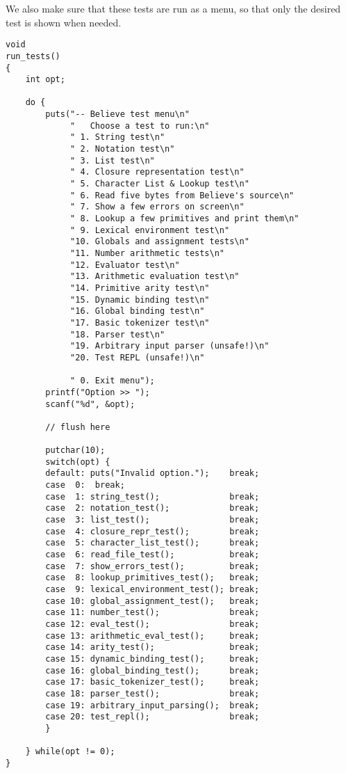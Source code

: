 \documentclass[openright,a4paper,twoside,12pt]{memoir}
\begin{document}
We also make sure that these tests are run as a menu, so that only the
desired test is shown when needed.

\begin{verbatim}
void
run_tests()
{
    int opt;

    do {
        puts("-- Believe test menu\n"
             "   Choose a test to run:\n"
             " 1. String test\n"
             " 2. Notation test\n"
             " 3. List test\n"
             " 4. Closure representation test\n"
             " 5. Character List & Lookup test\n"
             " 6. Read five bytes from Believe's source\n"
             " 7. Show a few errors on screen\n"
             " 8. Lookup a few primitives and print them\n"
             " 9. Lexical environment test\n"
             "10. Globals and assignment tests\n"
             "11. Number arithmetic tests\n"
             "12. Evaluator test\n"
             "13. Arithmetic evaluation test\n"
             "14. Primitive arity test\n"
             "15. Dynamic binding test\n"
             "16. Global binding test\n"
             "17. Basic tokenizer test\n"
             "18. Parser test\n"
             "19. Arbitrary input parser (unsafe!)\n"
             "20. Test REPL (unsafe!)\n"
             
             " 0. Exit menu");
        printf("Option >> ");
        scanf("%d", &opt);

        // flush here

        putchar(10);
        switch(opt) {
        default: puts("Invalid option.");    break;
        case  0:  break;
        case  1: string_test();              break;
        case  2: notation_test();            break;
        case  3: list_test();                break;
        case  4: closure_repr_test();        break;
        case  5: character_list_test();      break;
        case  6: read_file_test();           break;
        case  7: show_errors_test();         break;
        case  8: lookup_primitives_test();   break;
        case  9: lexical_environment_test(); break;
        case 10: global_assignment_test();   break;
        case 11: number_test();              break;
        case 12: eval_test();                break;
        case 13: arithmetic_eval_test();     break;
        case 14: arity_test();               break;
        case 15: dynamic_binding_test();     break;
        case 16: global_binding_test();      break;
        case 17: basic_tokenizer_test();     break;
        case 18: parser_test();              break;
        case 19: arbitrary_input_parsing();  break;
        case 20: test_repl();                break;
        }
        
    } while(opt != 0);
}
\end{verbatim}
\end{document}
